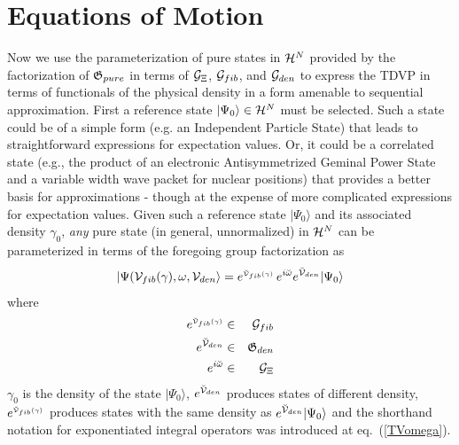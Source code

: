 \section{Equations of Motion}

Now we use the parameterization of pure states in ${\cal H}^{N}$ provided by
the factorization of ${\frak G}_{pure}$ in terms of ${\cal G}_{\Xi }$, $%
{\cal G}_{fib}$, and ${\cal G}_{den}$ to express the TDVP in terms of
functionals of the physical density in a form amenable to sequential
approximation. First a reference state $|\Psi _{0}\rangle \in {\cal H}^{N}$
must be selected. Such a state could be of a simple form (e.g. an
Independent Particle State) that leads to straightforward expressions for
expectation values. Or, it could be a correlated state (e.g., the product of
an electronic Antisymmetrized Geminal Power State \cite{Ortiz81} and a
variable width wave packet for nuclear positions) that provides a better
basis for approximations - though at the expense of more complicated
expressions for expectation values. Given such a reference state $|\Psi
_{0}\rangle $ and its associated density $\gamma _{0}$, {\em any} pure state
(in general, unnormalized) in ${\cal H}^{N}$ can be parameterized in terms
of the foregoing group factorization as 
\begin{equation}
|\Psi ({\cal V}_{fib}(\gamma ),\omega ,{\cal V}_{den}\rangle =e^{_{{\cal 
\breve{V}}_{fib}(\gamma )}}\,e^{i\breve{\omega}}e^{\breve{{\cal V}}%
_{den}}|\Psi _{0}\rangle  \label{vv1omega1}
\end{equation}%
where 
\begin{eqnarray}
e^{_{{\cal \breve{V}}_{fib}(\gamma )}} &\in &{\cal G}_{fib}  \nonumber \\
e^{\breve{{\cal V}}_{den}} &\in &{\frak G}_{den}  \nonumber \\
e^{i\breve{\omega}} &\in &{\cal G}_{\Xi }  \label{vv1omega2}
\end{eqnarray}%
$\gamma _{0}$ is the density of the state $|\Psi _{0}\rangle $, $e^{\breve{%
{\cal V}}_{den}}$ produces states of different density, $e^{_{{\cal \breve{V}%
}_{fib}(\gamma )}}$ produces states with the same density as $e^{\breve{%
{\cal V}}_{den}}|\Psi _{0}\rangle $ and the shorthand notation for
exponentiated integral operators was introduced at eq.~(\ref{TVomega}).

